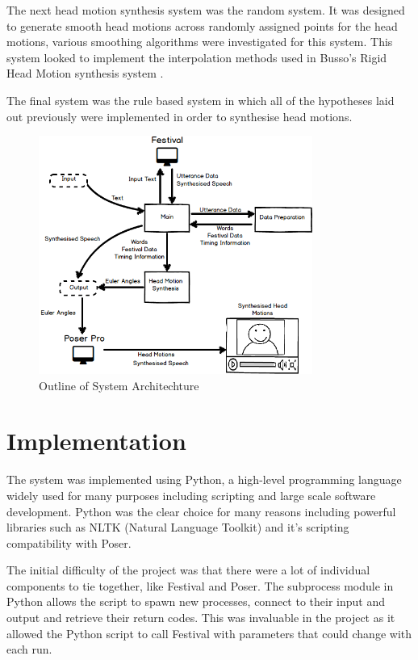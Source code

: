 \documentclass[bsc,frontabs,twoside,singlespacing,parskip,deptreport]{infthesis}
\begin{document}
The next head motion synthesis system was the random system. It was designed to generate smooth head motions across randomly assigned points for the head motions, various smoothing algorithms were investigated for this system. This system looked to implement the interpolation methods used in Busso's Rigid Head Motion synthesis system \cite{busso_rigid}.

The final system was the rule based system in which all of the hypotheses laid out previously were implemented in order to synthesise head motions. 

\begin{figure}
	\centering
	\includegraphics[width=0.8\textwidth]{system.png}
	\caption{Outline of System Architechture}
\end{figure}

\chapter{Implementation}

The system was implemented using Python, a high-level programming language widely used for many purposes including scripting and large scale software development. Python was the clear choice for many reasons including powerful libraries such as NLTK (Natural Language Toolkit) \cite{nltk} and it's scripting compatibility with Poser. 

The initial difficulty of the project was that there were a lot of individual components to tie together, like Festival and Poser. The subprocess module in Python allows the script to spawn new processes, connect to their input and output and retrieve their return codes. This was invaluable in the project as it allowed the Python script to call Festival with parameters that could change with each run.
\end{document}
